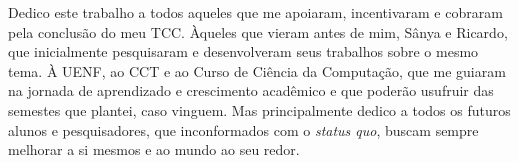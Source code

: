 \begin{dedicatoria}
  \vspace*{\fill}
  \centering
  \noindent

  Dedico este trabalho a todos aqueles que me apoiaram, incentivaram e cobraram pela conclusão do meu TCC. Àqueles que vieram antes de mim, Sânya e Ricardo, que inicialmente pesquisaram e desenvolveram seus trabalhos sobre o mesmo tema. À UENF, ao CCT e ao Curso de Ciência da Computação, que me guiaram na jornada de aprendizado e crescimento acadêmico e que poderão usufruir das semestes que plantei, caso vinguem. Mas principalmente dedico a todos os futuros alunos e pesquisadores, que inconformados com o \textit{status quo}, buscam sempre melhorar a si mesmos e ao mundo ao seu redor.

  \vspace*{\fill}
\end{dedicatoria}